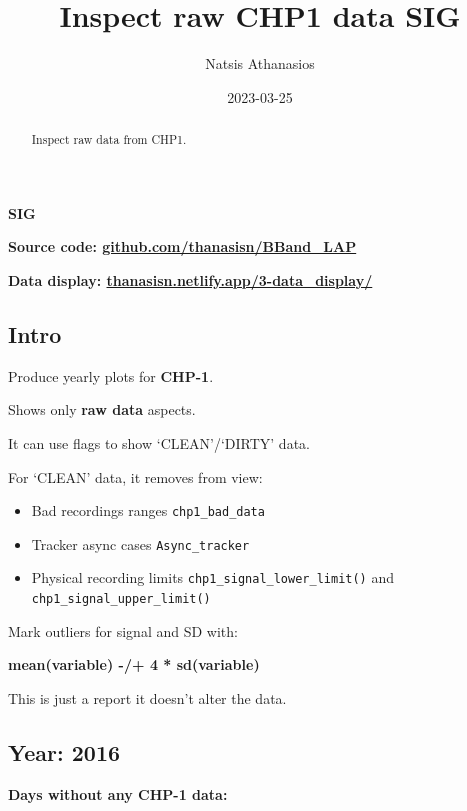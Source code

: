 \documentclass[
  10pt,
  a4paper,oneside]{article}
\title{Inspect raw CHP1 data \textbf{SIG}}
\author{Natsis Athanasios}
\date{2023-03-25}
\providecommand{\tightlist}{%
  \setlength{\itemsep}{0pt}\setlength{\parskip}{0pt}}
\begin{document}
\maketitle
\begin{abstract}
Inspect raw data from CHP1.
\end{abstract}

{
\hypersetup{linkcolor=}
\setcounter{tocdepth}{2}
\tableofcontents
}
\textbf{SIG}

\textbf{Source code: \href{https://github.com/thanasisn/BBand_LAP}{github.com/thanasisn/BBand\_LAP}}

\textbf{Data display: \href{https://thanasisn.netlify.app/3-data_display/}{thanasisn.netlify.app/3-data\_display/}}

\hypertarget{intro}{%
\subsection{Intro}\label{intro}}

Produce yearly plots for \textbf{CHP-1}.

Shows only \textbf{raw data} aspects.

It can use flags to show `CLEAN'/`DIRTY' data.

For `CLEAN' data, it removes from view:

\begin{itemize}
\tightlist
\item
  Bad recordings ranges \texttt{chp1\_bad\_data}
\item
  Tracker async cases \texttt{Async\_tracker}
\item
  Physical recording limits \texttt{chp1\_signal\_lower\_limit()} and \texttt{chp1\_signal\_upper\_limit()}
\end{itemize}

Mark outliers for signal and SD with:

\textbf{mean(variable) -/+ 4 * sd(variable)}

This is just a report it doesn't alter the data.

\FloatBarrier

\newpage

\hypertarget{year-2016}{%
\subsection{Year: 2016}\label{year-2016}}

\textbf{Days without any CHP-1 data:}
\end{document}
